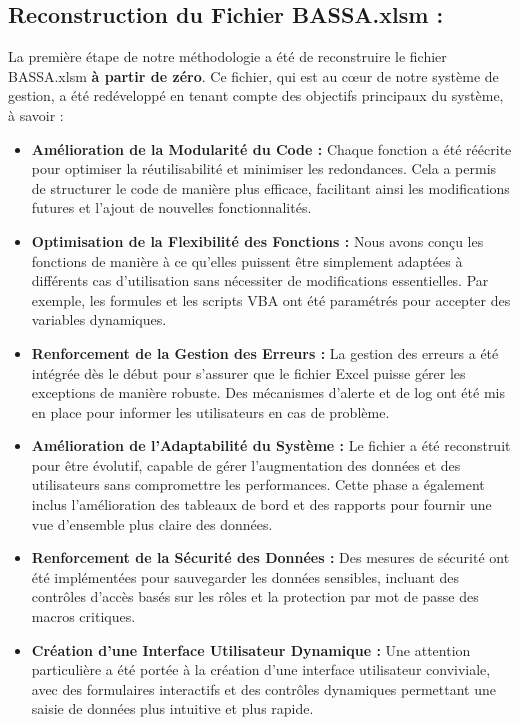 \documentclass[a4paper, oneside, 12pt, final]{extreport}
\begin{document}
\subsection{Reconstruction du Fichier BASSA.xlsm :}
La première étape de notre méthodologie a été de reconstruire le fichier BASSA.xlsm \textbf{à partir de zéro}. Ce fichier, qui est au cœur de notre système de gestion, a été redéveloppé en tenant compte des objectifs principaux du système, à savoir :
\begin{itemize}


\item \textbf{Amélioration de la Modularité du Code :} Chaque fonction a été réécrite pour optimiser la réutilisabilité et minimiser les redondances. Cela a permis de structurer le code de manière plus efficace, facilitant ainsi les modifications futures et l'ajout de nouvelles fonctionnalités.

\item \textbf{Optimisation de la Flexibilité des Fonctions :} Nous avons conçu les fonctions de manière à ce qu'elles puissent être simplement adaptées à différents cas d'utilisation sans nécessiter de modifications essentielles. Par exemple, les formules et les scripts VBA ont été paramétrés pour accepter des variables dynamiques.

\item \textbf{Renforcement de la Gestion des Erreurs :} La gestion des erreurs a été intégrée dès le début pour s'assurer que le fichier Excel puisse gérer les exceptions de manière robuste. Des mécanismes d'alerte et de log ont été mis en place pour informer les utilisateurs en cas de problème.

\item \textbf{Amélioration de l'Adaptabilité du Système :} Le fichier a été reconstruit pour être évolutif, capable de gérer l'augmentation des données et des utilisateurs sans compromettre les performances. Cette phase a également inclus l'amélioration des tableaux de bord et des rapports pour fournir une vue d'ensemble plus claire des données.

\item \textbf{Renforcement de la Sécurité des Données :} Des mesures de sécurité ont été implémentées pour sauvegarder les données sensibles, incluant des contrôles d'accès basés sur les rôles et la protection par mot de passe des macros critiques.

\item \textbf{Création d'une Interface Utilisateur Dynamique :} Une attention particulière a été portée à la création d'une interface utilisateur conviviale, avec des formulaires interactifs et des contrôles dynamiques permettant une saisie de données plus intuitive et plus rapide.
\end{itemize}
\end{document}
